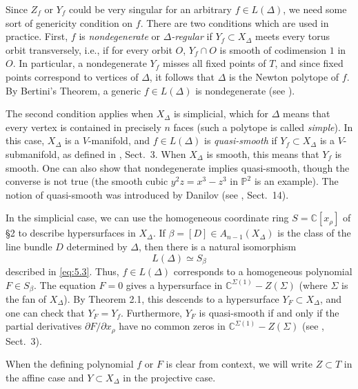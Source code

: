 \documentclass{amsart}
\theoremstyle{plain}
\theoremstyle{definition}
\begin{document}
	Since $Z_f$ or $Y_f$ could be very singular for an arbitrary
$f \in L(\Delta)$, we need some sort of genericity condition on $f$.
There are two conditions which are used in practice.  First, $f$ is
{\it nondegenerate\/} or {\it $\Delta$-regular\/} if $Y_f \subset
X_\Delta$ meets every torus orbit transversely, i.e., if for every
orbit $O$, $Y_f\cap O$ is smooth of codimension $1$ in $O$.  In
particular, a nondegenerate $Y_f$ misses all fixed points of $T$, and
since fixed points correspond to vertices of $\Delta$, it follows that
$\Delta$ is the Newton polytope of $f$.  By Bertini's Theorem, a
generic $f \in L(\Delta)$ is nondegenerate (see
\cite{Kho}).

	The second condition applies when $X_\Delta$ is simplicial,
which for $\Delta$ means that every vertex is contained in precisely
$n$ faces (such a polytope is called {\it simple\/}).  In this case,
$X_\Delta$ is a $V$-manifold, and $f \in L(\Delta)$ is {\it
quasi-smooth\/} if $Y_f \subset X_\Delta$ is a $V$-submanifold, as
defined in \cite{BC}, Sect.~3.  When $X_\Delta$ is smooth, this
means that $Y_f$ is smooth.  One can also show that nondegenerate
implies quasi-smooth, though the converse is not true (the smooth
cubic $y^2z = x^3-z^3$ in $\mathbb{P}^2$ is an example).  The notion of
quasi-smooth was introduced by Danilov (see \cite{Dan2}, Sect.~14). 

	In the simplicial case, we can use the homogeneous coordinate
ring $S = \mathbb{C}[x_\rho]$ of \S2 to describe hypersurfaces in
$X_\Delta$.  If $\beta = [D] \in A_{n-1}(X_\Delta)$ is the class of
the line bundle $D$ determined by $\Delta$, then there is a natural
isomorphism
\begin{equation}
L(\Delta) \simeq S_\beta
\tag{6.2}\label{eq:6.2}
\end{equation}
described in \eqref{eq:5.3}. Thus, $f \in L(\Delta)$ corresponds to a
homogeneous polynomial $F \in S_\beta$.  The equation $F = 0$ gives a
hypersurface in $\mathbb{C}^{\Sigma(1)}-Z(\Sigma)$ (where $\Sigma$ is
the fan of $X_\Delta$).  By Theorem 2.1, this descends to a
hypersurface $Y_F \subset X_\Delta$, and one can check that $Y_F =
Y_f$.  Furthermore, $Y_F$ is quasi-smooth if and only if the partial
derivatives $\partial F/\partial x_\rho$ have no common zeros in
$\mathbb{C}^{\Sigma(1)}-Z(\Sigma)$ (see \cite{BC}, Sect.~3).

	When the defining polynomial $f$ or $F$ is clear from context,
we will write $Z \subset T$ in the affine case and $Y \subset
X_\Delta$ in the projective case.
\end{document}
